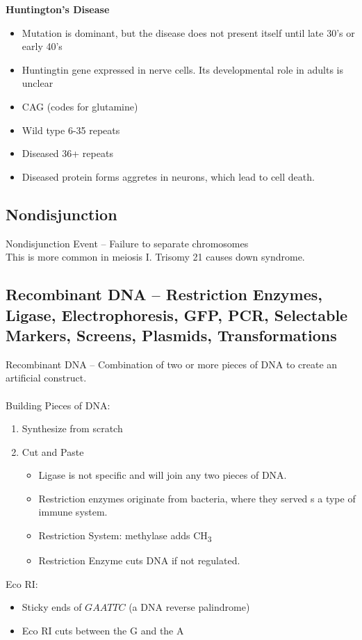 \documentclass{article}
\begin{document}
\textbf{Huntington's Disease}
\begin{itemize}
\item Mutation is dominant, but the disease does not present itself until late 30's or early 40's
\item Huntingtin gene expressed in nerve cells. Its developmental role in adults is unclear
\item CAG (codes for glutamine)
\item Wild type 6-35 repeats
\item Diseased 36+ repeats
\item Diseased protein forms aggretes in neurons, which lead to cell death.
\end{itemize}

\subsection{Nondisjunction}

Nondisjunction Event -- Failure to separate chromosomes\\
This is more common in meiosis I. Trisomy 21 causes down syndrome.

\subsection{Recombinant DNA -- Restriction Enzymes, Ligase, Electrophoresis, GFP, PCR, Selectable Markers, Screens, Plasmids, Transformations}
Recombinant DNA -- Combination of two or more pieces of DNA to create an artificial construct.\\
\\
Building Pieces of DNA:
\begin{enumerate}
\item Synthesize from scratch
\item Cut and Paste
\begin{itemize}
\item Ligase is not specific and will join any two pieces of DNA.
\item Restriction enzymes originate from bacteria, where they served s a type of immune system.
\item Restriction System: methylase adds CH\textsubscript{3}
\item Restriction Enzyme cuts DNA if not regulated.
\end{itemize}
\end{enumerate}

Eco RI:
\begin{itemize}
\item Sticky ends of $GAATTC$ (a DNA reverse palindrome)
\item Eco RI cuts between the G and the A
\end{itemize}
\end{document}
